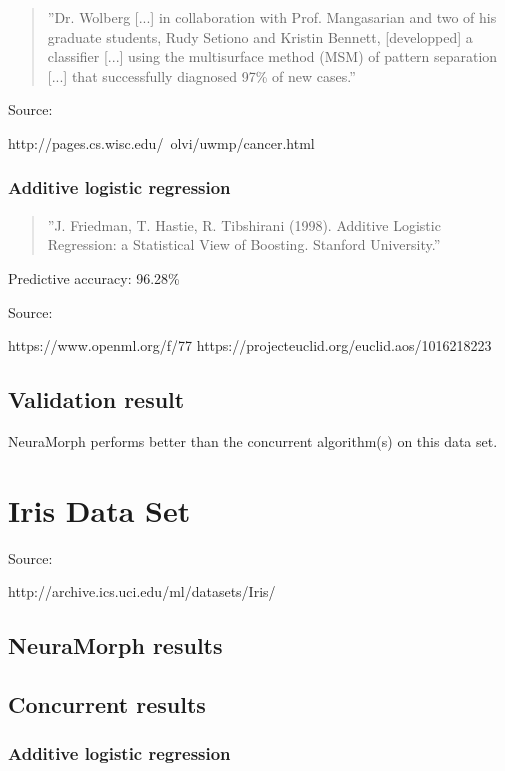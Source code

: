 \documentclass[8pt, a4paper]{article}
\begin{document}
\begin{quote}
''Dr. Wolberg [...] in collaboration with Prof. Mangasarian and two of his graduate students, Rudy Setiono and Kristin Bennett, [developped] a classifier [...] using the multisurface method (MSM) of pattern separation [...] that successfully diagnosed 97\% of new cases.''
\end{quote}

Source:

http://pages.cs.wisc.edu/~olvi/uwmp/cancer.html

\subsubsection{Additive logistic regression}

\begin{quote}
''J. Friedman, T. Hastie, R. Tibshirani (1998). Additive Logistic Regression: a Statistical View of Boosting. Stanford University.''
\end{quote}

Predictive accuracy: 96.28\%

Source:

https://www.openml.org/f/77
https://projecteuclid.org/euclid.aos/1016218223

\subsection{Validation result}

NeuraMorph performs better than the concurrent algorithm(s) on this data set.



\section{Iris Data Set}

Source: 

http://archive.ics.uci.edu/ml/datasets/Iris/

\subsection{NeuraMorph results}



\subsection{Concurrent results}

\subsubsection{Additive logistic regression}
\end{document}
